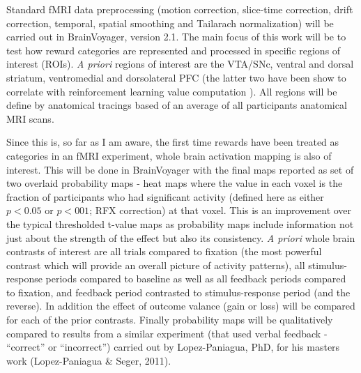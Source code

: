 \documentclass[doc,12pt]{apa}        %
\begin{document}
Standard fMRI data preprocessing (motion correction, slice-time correction, drift correction, temporal, spatial smoothing and Tailarach normalization) will be carried out in BrainVoyager, version 2.1.  The main focus of this work will be to test how reward categories are represented and processed in specific regions of interest (ROIs).  \emph{A priori} regions of interest are the VTA/SNc, ventral and dorsal striatum, ventromedial and dorsolateral PFC (the latter two have been show to correlate with reinforcement learning value computation ).  All regions will be define by anatomical tracings based of an average of all participants anatomical MRI scans.  

Since this is, so far as I am aware, the first time rewards have been treated as categories in an fMRI experiment, whole brain activation mapping is also of interest.  This will be done in BrainVoyager with the final maps reported as set of two overlaid probability maps - heat maps where the value in each voxel is the fraction of participants who had significant activity (defined here as either $p < 0.05$ or $p < 001$; RFX correction) at that voxel.   This is an improvement over the typical thresholded t-value maps as probability maps include information not just about the strength of the effect but also its consistency.  \emph{A priori} whole brain contrasts of interest are all trials compared to fixation (the most powerful contrast which will provide an overall picture of activity patterns), all stimulus-response periods compared to baseline as well as all feedback periods compared to fixation, and feedback period contrasted to stimulus-response period (and the reverse). In addition the effect of outcome valance (gain or loss) will be compared for each of the prior contrasts.  Finally probability maps will be qualitatively compared to results from a similar experiment (that used verbal feedback - ``correct'' or ``incorrect'') carried out by Lopez-Paniagua, PhD, for his masters work (Lopez-Paniagua & Seger, 2011). 
\end{document}
